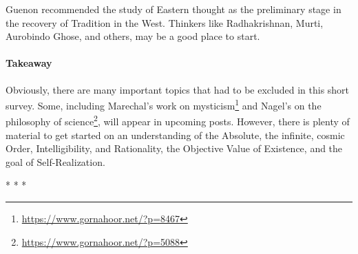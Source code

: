 Guenon recommended the study of Eastern thought as the preliminary stage in the recovery of Tradition in the West.
Thinkers like Radhakrishnan, Murti, Aurobindo Ghose, and others, may be a good place to start.

\paragraph{Takeaway}
Obviously, there are many important topics that had to be excluded in this short survey. Some, including
Marechal's work on mysticism\footnote{\url{https://www.gornahoor.net/?p=8467}} and Nagel's on the philosophy of science\footnote{\url{https://www.gornahoor.net/?p=5088}}, will appear in upcoming
posts. However, there is plenty of material to get started on an understanding of the Absolute, the infinite, cosmic
Order, Intelligibility, and Rationality, the Objective Value of Existence, and the goal of Self-Realization.


\begin{center}* * *\end{center}

